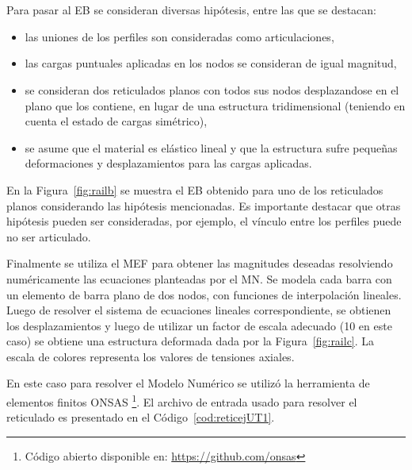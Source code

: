 \begin{figure}[htb]
  \centering
	\\
	\\
\end{figure} 


Para pasar al EB se consideran diversas hipótesis, entre las que se destacan:
\begin{itemize}
  \item las uniones de los perfiles son consideradas como articulaciones,
  \item las cargas puntuales aplicadas en los nodos se consideran de igual magnitud,
  \item se consideran dos reticulados planos con todos sus nodos desplazandose en el plano que los contiene, en lugar de una estructura tridimensional (teniendo en cuenta el estado de cargas simétrico), 
  \item se asume que el material es elástico lineal y que la estructura sufre pequeñas deformaciones y desplazamientos para las cargas aplicadas.
\end{itemize}
%
%
En la Figura~\ref{fig:railb} se muestra el EB obtenido para uno de los reticulados planos considerando las hipótesis mencionadas. %
%
Es importante destacar que otras hipótesis pueden ser consideradas, por ejemplo, el vínculo entre los perfiles puede no ser articulado. %


Finalmente se utiliza el MEF para obtener las magnitudes deseadas resolviendo numéricamente las ecuaciones planteadas por el MN. %
%
Se modela cada barra con un elemento de barra plano de dos nodos, con funciones de interpolación lineales. %
%
Luego de resolver el sistema de ecuaciones lineales correspondiente, se obtienen los desplazamientos y luego de utilizar un factor de escala adecuado (10 en este caso) se obtiene una estructura deformada dada por la Figura~\ref{fig:railc}. La escala de colores representa los valores de tensiones axiales. %
%

En este caso para resolver el Modelo Numérico se utilizó la herramienta de elementos finitos ONSAS \footnote{Código abierto disponible en: \href{https://github.com/onsas}{https://github.com/onsas}}. %
%
El archivo de entrada usado para resolver el reticulado es presentado en el Código~\ref{cod:reticejUT1}.


